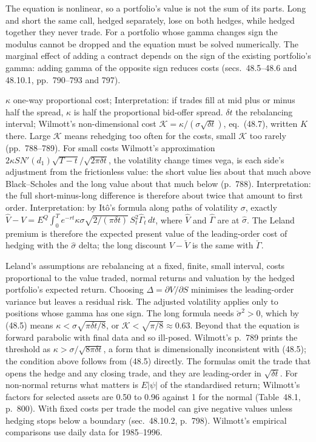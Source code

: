 \begin{qfmethod}
The equation is nonlinear, so a portfolio's value is not the sum of its parts. Long and short the same call, hedged separately, lose on both hedges, while hedged together they never trade. For a portfolio whose gamma changes sign the modulus cannot be dropped and the equation must be solved numerically. The marginal effect of adding a contract depends on the sign of the existing portfolio's gamma: adding gamma of the opposite sign reduces costs (secs.~48.5--48.6 and 48.10.1, pp.~790--793 and 797).

 $\kappa$ one-way proportional cost; Interpretation: if trades fill at mid plus or minus half the spread, $\kappa$ is half the proportional bid-offer spread. $\delta t$ the rebalancing interval; Wilmott's non-dimensional cost $\mathcal K=\kappa/(\sigma\sqrt{\delta t})$, eq.~(48.7), written $K$ there. Large $\mathcal K$ means rehedging too often for the costs, small $\mathcal K$ too rarely (pp.~788--789). For small costs Wilmott's approximation $2\kappa SN'(d_1)\sqrt{T-t}/\sqrt{2\pi\delta t}$, the volatility change times vega, is each side's adjustment from the frictionless value: the short value lies about that much above Black--Scholes and the long value about that much below (p.~788). Interpretation: the full short-minus-long difference is therefore about twice that amount to first order. Interpretation: by It\^o's formula along paths of volatility $\sigma$, exactly $\hat V-V=E^Q\int_0^Te^{-rt}\kappa\sigma\sqrt{2/(\pi\delta t)}\,S_t^2\hat\Gamma_t\,dt$, where $\hat V$ and $\hat\Gamma$ are at $\hat\sigma$. The Leland premium is therefore the expected present value of the leading-order cost of hedging with the $\hat\sigma$ delta; the long discount $V-\check V$ is the same with $\check\Gamma$.

 Leland's assumptions are rebalancing at a fixed, finite, small interval, costs proportional to the value traded, normal returns and valuation by the hedged portfolio's expected return. Choosing $\Delta=\partial V/\partial S$ minimises the leading-order variance but leaves a residual risk. The adjusted volatility applies only to positions whose gamma has one sign. The long formula needs $\check\sigma^2>0$, which by (48.5) means $\kappa<\sigma\sqrt{\pi\delta t/8}$, or $\mathcal K<\sqrt{\pi/8}\approx0.63$. Beyond that the equation is forward parabolic with final data and so ill-posed. Wilmott's p.~789 prints the threshold as $\kappa>\sigma/\sqrt{8\pi\delta t}$, a form that is dimensionally inconsistent with (48.5); the condition above follows from (48.5) directly. The formulas omit the trade that opens the hedge and any closing trade, and they are leading-order in $\sqrt{\delta t}$. For non-normal returns what matters is $E|\psi|$ of the standardised return; Wilmott's factors for selected assets are 0.50 to 0.96 against 1 for the normal (Table~48.1, p.~800). With fixed costs per trade the model can give negative values unless hedging stops below a boundary (sec.~48.10.2, p.~798). Wilmott's empirical comparisons use daily data for 1985--1996.


\end{qfmethod}
